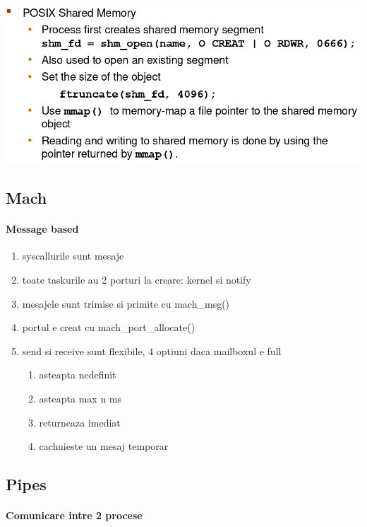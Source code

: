 \documentclass{article}
\begin{document}
\begin{center}
    \includegraphics[scale=0.3]{7_sharedmem.png}
\end{center}

\subsection*{Mach}
\paragraph*{Message based}
\begin{enumerate}
    \item syscallurile sunt mesaje
    \item toate taskurile au 2 porturi la creare: kernel si notify
    \item mesajele sunt trimise si primite cu mach\_msg()
    \item portul e creat cu mach\_port\_allocate()
    \item send si receive sunt flexibile, 4 optiuni daca mailboxul e full
          \begin{enumerate}
              \item asteapta nedefinit
              \item asteapta max n ms
              \item returneaza imediat
              \item cachuieste un mesaj temporar
          \end{enumerate}
\end{enumerate}

\subsection*{Pipes}
\paragraph*{Comunicare intre 2 procese}
\end{document}
